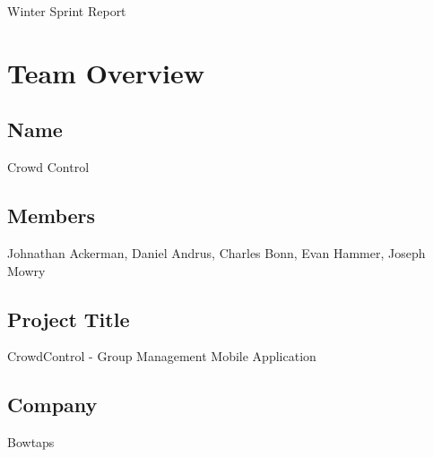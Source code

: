 \documentclass[11pt]{article}
\begin{document}
{\fontsize{16}{16}\selectfont Winter Sprint Report}

\section*{Team Overview}

\subsection*{Name}
Crowd Control
\subsection*{Members}
Johnathan Ackerman, Daniel Andrus, Charles Bonn, Evan Hammer, Joseph Mowry
\subsection*{Project Title}
CrowdControl - Group Management Mobile Application
\subsection*{Company}
Bowtaps
\end{document}
